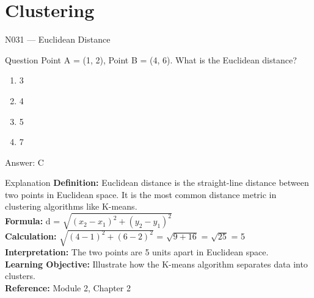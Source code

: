 \documentclass[aspectratio=169,8pt]{beamer}
\begin{document}
	\section{Clustering}
	
	\begin{frame}{N031 --- Euclidean Distance}
		\begin{block}{Question}
			Point A = (1, 2), Point B = (4, 6). What is the Euclidean distance?
			\begin{enumerate}
				\item 3
				\item 4
				\item 5
				\item 7
			\end{enumerate}
		\end{block}
		\begin{exampleblock}{Answer: C}\end{exampleblock}
		\begin{block}{Explanation}
			\textbf{Definition:} Euclidean distance is the straight-line distance between two points in Euclidean space. It is the most common distance metric in clustering algorithms like K-means.\\
			\textbf{Formula:} d = $\sqrt{(x_{2}-x_{1})^{2} + (y_{2}-y_{1})^{2}}$\\
			\textbf{Calculation:} $\sqrt{(4-1)^{2} + (6-2)^{2}}$ = $\sqrt{9+16}$ = $\sqrt{25}$ = 5\\
			\textbf{Interpretation:} The two points are 5 units apart in Euclidean space.\\
			\textbf{Learning Objective:} Illustrate how the K-means algorithm separates data into clusters.\\
			\textbf{Reference:} Module 2, Chapter 2
		\end{block}
	\end{frame}
	
\end{document}
